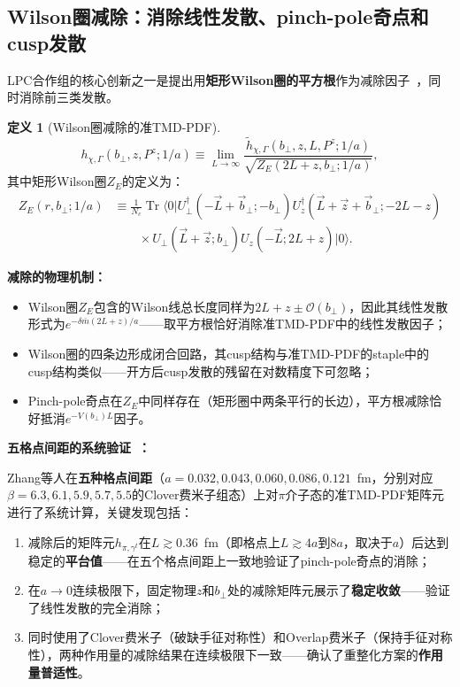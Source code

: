 \documentclass[12pt,a4paper]{ctexart}
\theoremstyle{definition}
\newtheorem{definition}{定义}[section]
\begin{document}
\subsection{Wilson圈减除：消除线性发散、pinch-pole奇点和cusp发散}

LPC合作组的核心创新之一是提出用\textbf{矩形Wilson圈的平方根}作为减除因子~\cite{Zhang2022renormTMD,He2024unpolTMD}，同时消除前三类发散。

\begin{definition}[Wilson圈减除的准TMD-PDF]
\begin{equation}
\boxed{h_{\chi,\Gamma}(b_\perp, z, P^z; 1/a) \equiv \lim_{L \to \infty} \frac{\tilde{h}_{\chi,\Gamma}(b_\perp, z, L, P^z; 1/a)}{\sqrt{Z_E(2L+z, b_\perp; 1/a)}}},
\label{eq:subtracted_TMD}
\end{equation}
其中矩形Wilson圈$Z_E$的定义为：
\begin{equation}
\begin{aligned}
Z_E(r, b_\perp; 1/a) &\equiv \frac{1}{N_c} \operatorname{Tr} \langle 0| U_\perp^\dagger(-\vec{L}+\vec{b}_\perp; -b_\perp) U_z^\dagger(\vec{L}+\vec{z}+\vec{b}_\perp; -2L-z) \\
&\qquad \times U_\perp(\vec{L}+\vec{z}; b_\perp) U_z(-\vec{L}; 2L+z) |0\rangle.
\end{aligned}
\label{eq:wilson_loop_full}
\end{equation}
\end{definition}

\textbf{减除的物理机制：}
\begin{itemize}
    \item Wilson圈$Z_E$包含的Wilson线总长度同样为$2L+z \pm \mathcal{O}(b_\perp)$，因此其线性发散形式为$e^{-\delta\bar{m}(2L+z)/a}$——取平方根恰好消除准TMD-PDF中的线性发散因子；
    \item Wilson圈的四条边形成闭合回路，其cusp结构与准TMD-PDF的staple中的cusp结构类似——开方后cusp发散的残留在对数精度下可忽略；
    \item Pinch-pole奇点在$Z_E$中同样存在（矩形圈中两条平行的长边），平方根减除恰好抵消$e^{-V(b_\perp)L}$因子。
\end{itemize}

\textbf{五格点间距的系统验证~\cite{Zhang2022renormTMD}：}

Zhang等人在\textbf{五种格点间距}（$a = 0.032, 0.043, 0.060, 0.086, 0.121$~fm，分别对应$\beta = 6.3, 6.1, 5.9, 5.7, 5.5$的Clover费米子组态）上对$\pi$介子态的准TMD-PDF矩阵元进行了系统计算，关键发现包括：
\begin{enumerate}
    \item 减除后的矩阵元$h_{\pi,\gamma^t}$在$L \gtrsim 0.36$~fm（即格点上$L \gtrsim 4a$到$8a$，取决于$a$）后达到稳定的\textbf{平台值}——在五个格点间距上一致地验证了pinch-pole奇点的消除；
    \item 在$a \to 0$连续极限下，固定物理$z$和$b_\perp$处的减除矩阵元展示了\textbf{稳定收敛}——验证了线性发散的完全消除；
    \item 同时使用了Clover费米子（破缺手征对称性）和Overlap费米子（保持手征对称性），两种作用量的减除结果在连续极限下一致——确认了重整化方案的\textbf{作用量普适性}。
\end{enumerate}
\end{document}

